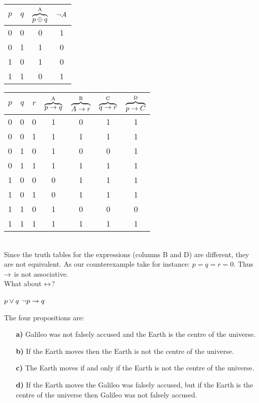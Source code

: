 \begin{solutions}
\spart
\begin{tabular}{cc | cc}
	\toprule
	$p$& $q$&
	$\overbrace{p \oplus q}^\text{A}$&
	$\lnot A$\\
	\midrule
	\strut
	0& 0& 0& 1\\
	0& 1& 1& 0\\
	1& 0& 1& 0\\
	1& 1& 0& 1\\
	\bottomrule
\end{tabular}

\setcounter{solutioncounter}{3}
\solution 
\begin{tabular}{ccc | cccc}
	\toprule
	$p$& $q$& $r$ &
	$\overbrace{p\rightarrow q}^\text{A}$ & 
	$\overbrace{A \rightarrow r}^\text{B}$ &
	$\overbrace{q \rightarrow r}^\text{C}$ &
	$\overbrace{p \rightarrow C}^\text{D}$
	\\
	\midrule
	\strut 
	0& 0&  0& 1& 0 & 1 & 1\\
	0& 0&  1& 1& 1 & 1 & 1\\
	0& 1&  0& 1& 0 & 0 & 1\\
	0& 1&  1& 1& 1 & 1 & 1\\
	1& 0&  0& 0& 1 & 1 & 1\\
	1& 0&  1& 0& 1 & 1 & 1\\
	1& 1&  0& 1& 0 & 0 & 0\\
	1& 1&  1& 1& 1 & 1 & 1\\
	\bottomrule
\end{tabular}

\hfill\\
Since the truth tables for the expressions (columns B and D) are different, they are not equivalent. As our counterexample take for instance: $p=q=r=0$. Thus $\rightarrow$ is not associative. \\
What about $\leftrightarrow$?

\setcounter{solutioncounter}{4}
\solution
\spart
$p \vee q$ 
\spart
$\lnot p \rightarrow q$

\setcounter{solutioncounter}{5}
\solution
The four propositions are:
\begin{enumerate}
	\item[\textbf{a)}] Galileo was not falsely accused and the Earth is the centre of the universe. %
	\item[\textbf{b)}] If the Earth moves then the Earth is not the centre of the universe. %
	\item[\textbf{c)}] The Earth moves if and only if the Earth is not the centre of the universe. %
	\item[\textbf{d)}] If the Earth moves the Galileo was falsely accused, but if the Earth is the centre of the universe then Galileo was not falsely accused.
\end{enumerate}


\end{solutions}
